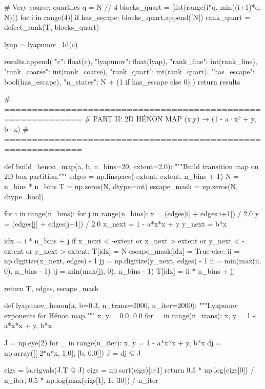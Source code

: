 {{{{{{{{{{{{{        # Very coarse: quartiles
        q = N // 4
        blocks_quart = [list(range(i*q, min((i+1)*q, N))) for i in range(4)]
        if has_escape:
            blocks_quart.append([N])
        rank_quart = defect_rank(T, blocks_quart)
        
        lyap = lyapunov_1d(c)
        
        results.append({
            "c": float(c),
            "lyapunov": float(lyap),
            "rank_fine": int(rank_fine),
            "rank_coarse": int(rank_coarse),
            "rank_quart": int(rank_quart),
            "has_escape": bool(has_escape),
            "n_states": N + (1 if has_escape else 0)
        })
    return results


# ============================================================
# PART II: 2D HÉNON MAP  (x,y) → (1 - a·x² + y, b·x)
# ============================================================

def build_henon_map(a, b, n_bins=20, extent=2.0):
    """Build transition map on 2D box partition."""
    edges = np.linspace(-extent, extent, n_bins + 1)
    N = n_bins * n_bins
    T = np.zeros(N, dtype=int)
    escape_mask = np.zeros(N, dtype=bool)
    
    for i in range(n_bins):
        for j in range(n_bins):
            x = (edges[i] + edges[i+1]) / 2.0
            y = (edges[j] + edges[j+1]) / 2.0
            x_next = 1 - a*x*x + y
            y_next = b*x
            
            idx = i * n_bins + j
            if x_next < -extent or x_next > extent or y_next < -extent or y_next > extent:
                T[idx] = N
                escape_mask[idx] = True
            else:
                ii = np.digitize(x_next, edges) - 1
                jj = np.digitize(y_next, edges) - 1
                ii = min(max(ii, 0), n_bins - 1)
                jj = min(max(jj, 0), n_bins - 1)
                T[idx] = ii * n_bins + jj
    
    return T, edges, escape_mask


def lyapunov_henon(a, b=0.3, n_trans=2000, n_iter=2000):
    """Lyapunov exponents for Hénon map."""
    x, y = 0.0, 0.0
    for _ in range(n_trans):
        x, y = 1 - a*x*x + y, b*x
    
    J = np.eye(2)
    for _ in range(n_iter):
        x, y = 1 - a*x*x + y, b*x
        dj = np.array([[-2*a*x, 1.0], [b, 0.0]])
        J = dj @ J
    
    eigs = la.eigvals(J.T @ J)
    eigs = np.sort(eigs)[::-1]
    return 0.5 * np.log(eigs[0]) / n_iter, 0.5 * np.log(max(eigs[1], 1e-30)) / n_iter


}}}}}}}}}}}}}
